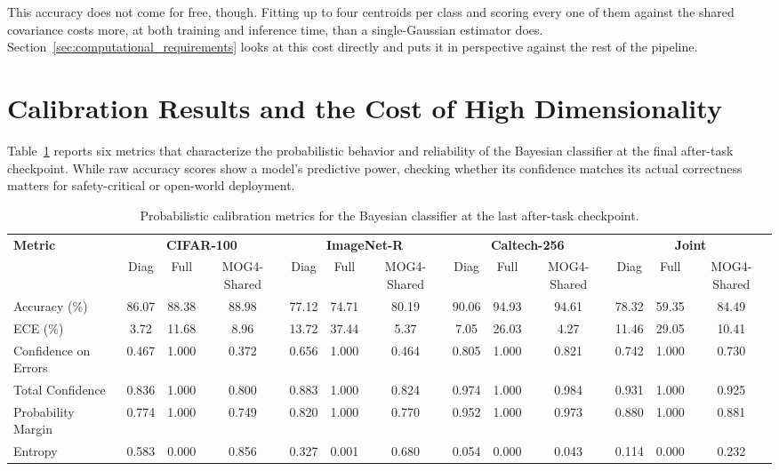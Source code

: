 This accuracy does not come for free, though. Fitting up to four centroids per class and scoring every one of them against the shared covariance costs more, at both training and inference time, than a single-Gaussian estimator does. Section~\ref{sec:computational_requirements} looks at this cost directly and puts it in perspective against the rest of the pipeline.

\section{Calibration Results and the Cost of High Dimensionality}
\label{sec:calibration_results_section}

Table~\ref{tab:calibration_metrics} reports six metrics that characterize the probabilistic behavior and reliability of the Bayesian classifier at the final after-task checkpoint. While raw accuracy scores show a model's predictive power, checking whether its confidence matches its actual correctness matters for safety-critical or open-world deployment.

\begin{table}[htbp]
	\centering
	\caption{Probabilistic calibration metrics for the Bayesian classifier at the last after-task checkpoint.}
	\label{tab:calibration_metrics}
	\scriptsize
	\setlength{\tabcolsep}{3pt}
	\begin{adjustbox}{max width=\textwidth, center}
	\begin{tabular}{l|ccc|ccc|ccc|ccc}
		\toprule
		\textbf{Metric} & \multicolumn{3}{c|}{\textbf{CIFAR-100}} & \multicolumn{3}{c|}{\textbf{ImageNet-R}} & \multicolumn{3}{c|}{\textbf{Caltech-256}} & \multicolumn{3}{c}{\textbf{Joint}} \\
		                & Diag & Full & MOG4-Shared & Diag & Full & MOG4-Shared & Diag & Full & MOG4-Shared & Diag & Full & MOG4-Shared \\
		\midrule
		Accuracy (\%)        & 86.07 & 88.38 & 88.98 & 77.12 & 74.71 & 80.19 & 90.06 & 94.93 & 94.61 & 78.32 & 59.35 & 84.49 \\
		ECE (\%)             & 3.72  & 11.68 & 8.96  & 13.72 & 37.44 & 5.37  & 7.05  & 26.03 & 4.27  & 11.46 & 29.05 & 10.41 \\
		Confidence on Errors & 0.467 & 1.000 & 0.372 & 0.656 & 1.000 & 0.464 & 0.805 & 1.000 & 0.821 & 0.742 & 1.000 & 0.730 \\
		Total Confidence     & 0.836 & 1.000 & 0.800 & 0.883 & 1.000 & 0.824 & 0.974 & 1.000 & 0.984 & 0.931 & 1.000 & 0.925 \\
		Probability Margin   & 0.774 & 1.000 & 0.749 & 0.820 & 1.000 & 0.770 & 0.952 & 1.000 & 0.973 & 0.880 & 1.000 & 0.881 \\
		Entropy              & 0.583 & 0.000 & 0.856 & 0.327 & 0.001 & 0.680 & 0.054 & 0.000 & 0.043 & 0.114 & 0.000 & 0.232 \\
		\bottomrule
	\end{tabular}
	\end{adjustbox}
\end{table}


